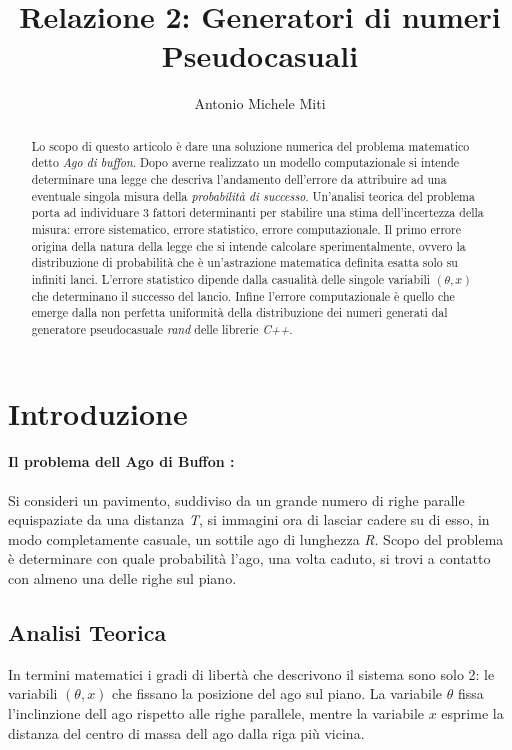 \documentclass{article}
\title{Relazione 2: Generatori di numeri Pseudocasuali}
\author{Antonio Michele Miti}
\begin{document}
\maketitle
\begin{abstract}
Lo scopo di questo articolo è dare una soluzione numerica del problema matematico detto \emph{Ago di buffon}.
Dopo averne realizzato un modello computazionale si intende determinare una legge che descriva l'andamento dell'errore da attribuire ad una eventuale singola misura della \emph{probabilità di successo}.
Un'analisi teorica del problema porta ad individuare 3 fattori determinanti per stabilire una stima dell'incertezza della misura: errore sistematico, errore statistico, errore computazionale. Il primo errore origina della natura della legge che si intende calcolare sperimentalmente, ovvero la distribuzione di probabilità che è un'astrazione matematica definita esatta solo su infiniti lanci. 
L'errore statistico dipende dalla casualità delle singole variabili $ \left( \theta ,x \right) $ che determinano il successo del lancio. Infine l'errore computazionale è quello che emerge dalla non perfetta uniformità della distribuzione dei numeri generati dal generatore pseudocasuale \emph{rand} delle librerie \emph{C++}.
\end{abstract}


\section{Introduzione}
\paragraph{Il problema dell Ago di Buffon :}

Si consideri un pavimento, suddiviso da un grande numero di righe paralle equispaziate da una distanza \emph{T}, si immagini ora di lasciar cadere su di esso, in modo completamente casuale, un sottile ago di lunghezza \emph{R}. Scopo del problema è determinare con quale probabilità l'ago, una volta caduto, si trovi a contatto con almeno una delle righe sul piano. 

\subsection{Analisi Teorica}
In termini matematici i gradi di libertà che descrivono il sistema sono solo 2: le variabili $(\theta,x)$ che fissano la posizione del ago sul piano. 
La variabile $ \theta $ fissa l'inclinzione dell ago rispetto alle righe parallele, mentre la variabile $x$ esprime la distanza del centro di massa dell ago dalla riga più vicina.
\end{document}
